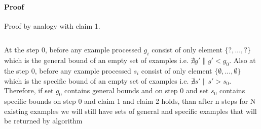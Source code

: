 \paragraph*{Proof}

Proof by analogy with claim 1.

\[\]

At the step 0, before any example processed $g_i$ consist of only element $\{?, ... ,?\}$ which is the general bound of an empty set of examples i.e. $\nexists g' \| g'<g_0$. Also at the step 0, before any example processed $s_i$ consist of only element $\{\emptyset, ... ,\emptyset\}$ which is the specific bound of an empty set of examples i.e. $\nexists s' \| s'>s_0$.
\[\]
Therefore, if set $g_0$ contains general bounds and on step 0 and set $s_0$ contains specific bounds on step 0 and claim 1 and claim 2 holds, than after n steps for N existing examples we will still have sets of general and specific examples that will be returned by algorithm

